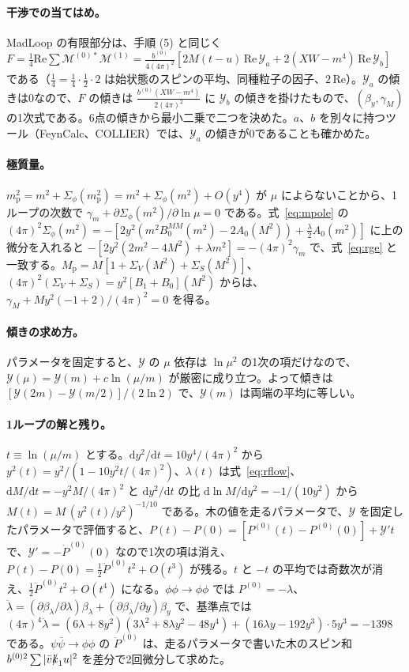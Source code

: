 \documentclass[a4paper,10pt]{ltjsarticle}
\newcommand{\dd}{\mathrm{d}}
\begin{document}
\paragraph{干渉での当てはめ。}MadLoop の有限部分は、手順 (5) と同じく $F=\frac14\mathrm{Re}\sum\mathcal M^{(0)*}\mathcal M^{(1)}=\frac{b^{(0)}}{4(4\pi)^2}[2M(t-u)\,\mathrm{Re}\,\mathcal Y_a+2(XW-m^4)\,\mathrm{Re}\,\mathcal Y_b]$ である（$\frac14=\frac14\cdot\frac12\cdot2$ は始状態のスピンの平均、同種粒子の因子、$2\,\mathrm{Re}$）。$\mathcal Y_a$ の傾きは0なので、$F$ の傾きは $\frac{b^{(0)}(XW-m^4)}{2(4\pi)^2}$ に $\mathcal Y_b$ の傾きを掛けたもので、$(\beta_y,\gamma_M)$ の1次式である。6点の傾きから最小二乗で二つを決めた。$a$、$b$ を別々に持つツール（FeynCalc、COLLIER）では、$\mathcal Y_a$ の傾きが0であることも確かめた。

\paragraph{極質量。}$m_{\mathrm p}^2=m^2+\Sigma_\phi(m_{\mathrm p}^2)=m^2+\Sigma_\phi(m^2)+O(y^4)$ が $\mu$ によらないことから、1ループの次数で $\gamma_m+\partial\Sigma_\phi(m^2)/\partial\ln\mu=0$ である。式~\eqref{eq:mpole} の $(4\pi)^2\Sigma_\phi(m^2)=-[2y^2(m^2B_0^{MM}(m^2)-2A_0(M^2))+\frac\lambda2A_0(m^2)]$ に上の微分を入れると $-[2y^2(2m^2-4M^2)+\lambda m^2]=-(4\pi)^2\gamma_m$ で、式~\eqref{eq:rge} と一致する。$M_{\mathrm p}=M[1+\Sigma_V(M^2)+\Sigma_S(M^2)]$、$(4\pi)^2(\Sigma_V+\Sigma_S)=y^2[B_1+B_0](M^2)$ からは、$\gamma_M+My^2(-1+2)/(4\pi)^2=0$ を得る。

\paragraph{傾きの求め方。}パラメータを固定すると、$\mathcal Y$ の $\mu$ 依存は $\ln\mu^2$ の1次の項だけなので、$\mathcal Y(\mu)=\mathcal Y(m)+c\ln(\mu/m)$ が厳密に成り立つ。よって傾きは $[\mathcal Y(2m)-\mathcal Y(m/2)]/(2\ln2)$ で、$\mathcal Y(m)$ は両端の平均に等しい。

\paragraph{1ループの解と残り。}$t\equiv\ln(\mu/m)$ とする。$\dd y^2/\dd t=10y^4/(4\pi)^2$ から $y^2(t)=y^2/(1-10y^2t/(4\pi)^2)$、$\lambda(t)$ は式~\eqref{eq:rflow}、$\dd M/\dd t=-y^2M/(4\pi)^2$ と $\dd y^2/\dd t$ の比 $\dd\ln M/\dd y^2=-1/(10y^2)$ から $M(t)=M\,(y^2(t)/y^2)^{-1/10}$ である。木の値を走るパラメータで、$\mathcal Y$ を固定したパラメータで評価すると、$P(t)-P(0)=[P^{(0)}(t)-P^{(0)}(0)]+\mathcal Y't$ で、$\mathcal Y'=-\dot P^{(0)}(0)$ なので1次の項は消え、$P(t)-P(0)=\frac12\ddot P^{(0)}t^2+O(t^3)$ が残る。$t$ と $-t$ の平均では奇数次が消え、$\frac12\ddot P^{(0)}t^2+O(t^4)$ になる。$\phi\phi\to\phi\phi$ では $P^{(0)}=-\lambda$、$\ddot\lambda=(\partial\beta_\lambda/\partial\lambda)\beta_\lambda+(\partial\beta_\lambda/\partial y)\beta_y$ で、基準点では $(4\pi)^4\ddot\lambda=(6\lambda+8y^2)(3\lambda^2+8\lambda y^2-48y^4)+(16\lambda y-192y^3)\cdot5y^3=-1398$ である。$\psi\bar\psi\to\phi\phi$ の $\ddot P^{(0)}$ は、走るパラメータで書いた木のスピン和 $b^{(0)2}\sum|\bar v\slashed k_1u|^2$ を差分で2回微分して求めた。
\end{document}
